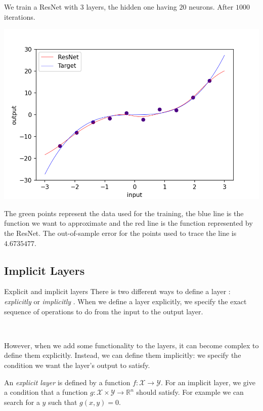 \documentclass[11pt]{beamer}
\begin{document}
\begin{frame}

We train a ResNet with $3$ layers, the hidden one having $20$ neurons. After $1000$ iterations.


\begin{center}
\includegraphics[scale=0.4]{ex_resnet.png}
\end{center}

The green points represent the data used for the training, the blue line is the function we want to approximate and the red line is the function represented by the ResNet. The out-of-sample error for the points used to trace the line is $4.6735477$.
\end{frame}

\subsection{Implicit Layers}
\begin{frame}{Explicit and implicit layers}
There is two different ways to define a layer : \textit{explicitly} or \textit{implicitly} \cite{2}. When we define a layer explicitly, we specify the exact sequence of operations to do from the input to the output layer. 

~

However, when we add some functionality to the layers, it can become complex to define them explicitly. Instead, we can define them implicitly: we specify the condition we want the layer's output to satisfy. 

\begin{definition}
An \textit{explicit layer} is defined by a function $f : \mathcal{X} \rightarrow \mathcal{Y}$. For an implicit layer, we give a condition that a function $g: \mathcal{X} \times \mathcal{Y} \rightarrow \mathbb{R}^n$ should satisfy. For example we can search for a $y$ such that $g(x,y) = 0$.
\end{definition}
\end{frame}
\end{document}
